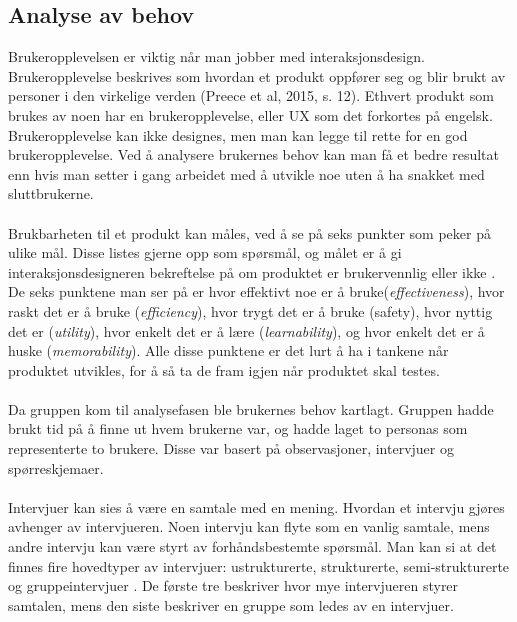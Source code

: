 \subsection{Analyse av behov}
Brukeropplevelsen er viktig når man jobber med interaksjonsdesign. Brukeropplevelse beskrives som hvordan et produkt oppfører seg og blir brukt av personer i den virkelige verden (Preece et al, 2015, s. 12). Ethvert produkt som brukes av noen har en brukeropplevelse, eller UX som det forkortes på engelsk. Brukeropplevelse kan ikke designes, men man kan legge til rette for en god brukeropplevelse. Ved å analysere brukernes behov kan man få et bedre resultat enn hvis man setter i gang arbeidet med å utvikle noe uten å ha snakket med sluttbrukerne.
\\\\
Brukbarheten til et produkt kan måles, ved å se på seks punkter som peker på ulike mål. Disse listes gjerne opp som spørsmål, og målet er å gi interaksjonsdesigneren bekreftelse på om produktet er brukervennlig eller ikke \cite[s.~19]{preece}. De seks punktene man ser på er hvor effektivt noe er å bruke(\textit{effectiveness}), hvor raskt det er å bruke (\textit{efficiency}), hvor trygt det er å bruke (safety), hvor nyttig det er (\textit{utility}), hvor enkelt det er å lære (\textit{learnability}), og hvor enkelt det er å huske (\textit{memorability}). Alle disse punktene er det lurt å ha i tankene når produktet utvikles, for å så ta de fram igjen når produktet skal testes. 
\\\\
Da gruppen kom til analysefasen ble brukernes behov kartlagt. Gruppen hadde brukt tid på å finne ut hvem brukerne var, og hadde laget to personas som representerte to brukere. Disse var basert på observasjoner, intervjuer og spørreskjemaer. 
\\\\
Intervjuer kan sies å være en samtale med en mening\cite{kahn}. Hvordan et intervju gjøres avhenger av intervjueren. Noen intervju kan flyte som en vanlig samtale, mens andre intervju kan være styrt av forhåndsbestemte spørsmål. Man kan si at det finnes fire hovedtyper av intervjuer: ustrukturerte, strukturerte, semi-strukturerte og gruppeintervjuer \cite[s.~233]{preece}. De første tre beskriver hvor mye intervjueren styrer samtalen, mens den siste beskriver en gruppe som ledes av en intervjuer. 



